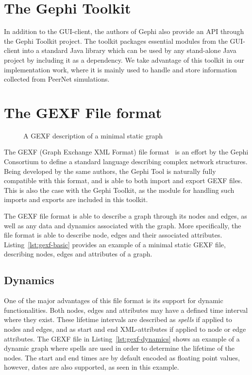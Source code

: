 \section{The Gephi Toolkit}

In addition to the GUI-client, the authors of Gephi also provide an API
through the Gephi Toolkit project. The toolkit packages essential
modules from the GUI-client into a standard Java library which can
be used by any stand-alone Java project by including it as a dependency.
We take advantage of this toolkit in our implementation work, where it
is mainly used to handle and store information collected from PeerNet
simulations.

\section{The GEXF File format}
\begin{figure}[h]

\caption{A GEXF description of a minimal static graph}
\end{figure}
The GEXF (Graph Exchange XML Format) file format~\cite{gexf} is an
effort by the Gephi Consortium to define a standard language describing
complex network structures. Being developed by the same authors,
the Gephi Tool is naturally fully compatible with this format, and is
able to both import and export GEXF files. This is also the case with
the Gephi Toolkit, as the module for handling such imports and exports
are included in this toolkit.

The GEXF file format is able to describe a graph through its nodes and
edges, as well as any data and dynamics associated with the graph. More
specifically, the file format is able to describe node, edges and their
associated attributes. Listing~\ref{lst:gexf-basic} provides an example
of a minimal static GEXF file, describing nodes, edges and attributes of
a graph.

\subsection{Dynamics}

One of the major advantages of this file format is its support for
dynamic functionalities.  Both nodes, edges and attributes may have a
defined time interval where they exist. These lifetime intervals are
described as \emph{spells} if applied to nodes and edges, and as start
and end XML-attributes if applied to node or edge attributes. The
GEXF file in Listing~\ref{lst:gexf-dynamics} shows an example of a
dynamic graph where spells are used in order to determine the lifetime
of the nodes. The start and end times are by default encoded as
floating point values, however, dates are also supported, as seen in this example.

